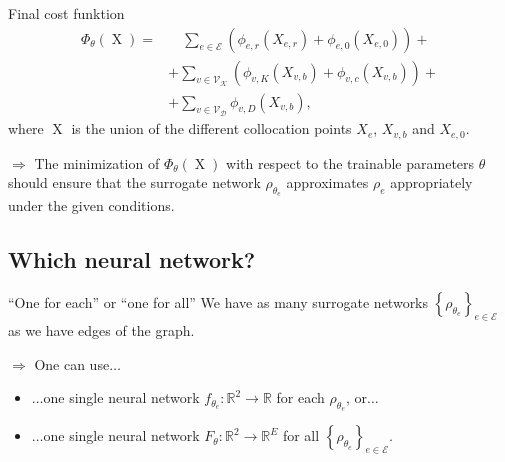 \documentclass[9pt]{beamer}
\begin{document}
\begin{frame}{Final cost funktion}
    \begin{equation*}
        \begin{aligned} 
            \Phi_{\theta} \left( \operatorname{X} \right)  = & \quad \sum_{e \in \mathcal{E}}  \left(  \phi_{e,r}  \left( X_{e,r} \right) + \phi_{e,0}  \left( X_{e,0} \right)  \right) + \\
            & + \sum_{v \in \mathcal{V}_\mathcal{K}}  \left(  \phi_{v,K}  \left( X_{v,b} \right) + \phi_{v,c} \left( X_{v,b} \right)  \right) + \\
            & + \sum_{v \in \mathcal{V}_\mathcal{D}} \phi_{v,D} \left( X_{v,b} \right),
        \end{aligned}
    \end{equation*}
    where $\operatorname{X}$ is the union of the different collocation points $X_e$, $X_{v,b}$ and $X_{e,0}$. \\

    \vspace{5mm}

    $\Rightarrow$ The minimization of $\Phi_{\theta} \left( \operatorname{X} \right)$ with respect to the trainable parameters $\theta$ should ensure that the surrogate network $\rho_{\theta_e}$ approximates $\rho_{e}$ appropriately under the given conditions. 
\end{frame}



\subsection{Which neural network?}



\begin{frame}{“One for each” or “one for all”}
    We have as many surrogate networks $\left\{ \rho_{\theta_e} \right\}_{e \in \mathcal{E}}$ as we have edges of the graph. \\

    \vspace{5mm}

    $\Rightarrow$ One can use$\ldots$
    \begin{itemize}
        \item $\ldots$one single neural network $f_{\theta_e} \colon \mathbb{R}^2 \to \mathbb{R}$ for each $\rho_{\theta_e}$, or$\ldots$
        \item $\ldots$one single neural network $F_{\theta} \colon \mathbb{R}^2 \to \mathbb{R}^E$ for all $\left\{ \rho_{\theta_e} \right\}_{e \in \mathcal{E}}$.
    \end{itemize}
\end{frame}
\end{document}
